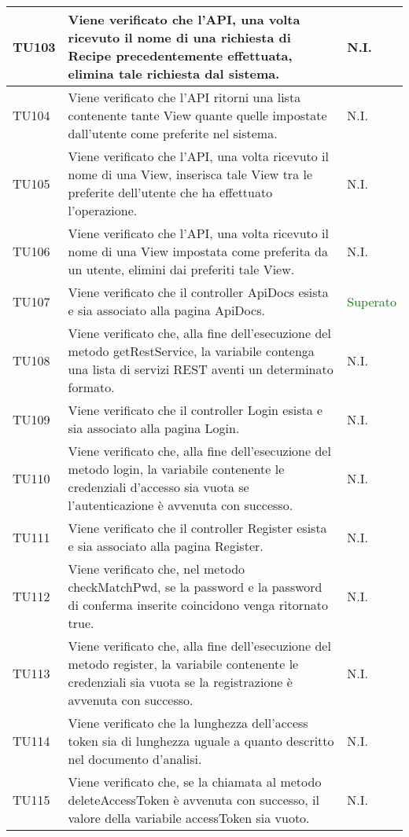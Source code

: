 \begin{center}
\begin{longtable}{| p{2cm} | p{8cm} | p{2.5cm} |}
					\hline
					TU103 & Viene verificato che l'API, una volta ricevuto il nome di una richiesta di Recipe precedentemente effettuata, elimina tale richiesta dal sistema. & N.I.\\
					\hline
					TU104 & Viene verificato che l'API ritorni una lista contenente tante View quante quelle impostate dall'utente come preferite nel sistema. & N.I.\\
					\hline
					TU105 & Viene verificato che l'API, una volta ricevuto il nome di una View, inserisca tale View tra le preferite dell'utente che ha effettuato l'operazione. & N.I.\\
					\hline
					TU106 & Viene verificato che l'API, una volta ricevuto il nome di una View impostata come preferita da un utente, elimini dai preferiti tale View. & N.I.\\
					\hline
					TU107 & Viene verificato che il controller ApiDocs esista e sia associato alla pagina ApiDocs. & \textcolor{green}{Superato}\\
					\hline
					TU108 & Viene verificato che, alla fine dell'esecuzione del metodo getRestService, la variabile contenga una lista di servizi REST aventi un determinato formato. & N.I.\\
					\hline
					TU109 & Viene verificato che il controller Login esista e sia associato alla pagina Login. & N.I.\\
					\hline
					TU110 & Viene verificato che, alla fine dell'esecuzione del metodo login, la variabile contenente le credenziali d'accesso sia vuota se l'autenticazione è avvenuta con successo. & N.I.\\
					\hline
					TU111 & Viene verificato che il controller Register esista e sia associato alla pagina Register. & N.I.\\
					\hline
					TU112 & Viene verificato che, nel metodo checkMatchPwd, se la password e la password di conferma inserite coincidono venga ritornato true. & N.I.\\
					\hline
					TU113 & Viene verificato che, alla fine dell'esecuzione del metodo register, la variabile contenente le credenziali sia vuota se la registrazione è avvenuta con successo. & N.I.\\
					\hline
					TU114 & Viene verificato che la lunghezza dell'access token sia di lunghezza uguale a quanto descritto nel documento d'analisi. & N.I.\\
					\hline
					TU115 & Viene verificato che, se la chiamata al metodo deleteAccessToken è avvenuta con successo, il valore della variabile accessToken sia vuoto. & N.I.\\

\end{longtable}
\end{center}
